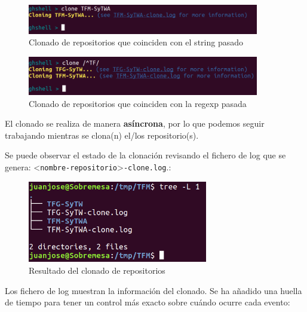 \begin{itemize}
		\begin{figure}[H]
		\begin{center}
		\includegraphics[width=0.9\textwidth]{images/clone1-1}
		\caption{Clonado de repositorios que coinciden con el string pasado}
		\label{fig:clone1-1}
		\end{center}
		\end{figure}
		
		\begin{figure}[H]
		\begin{center}
		\includegraphics[width=0.9\textwidth]{images/clone1-2}
		\caption{Clonado de repositorios que coinciden con la regexp pasada}
		\label{fig:clone1-2}
		\end{center}
		\end{figure}
		
		
		El clonado se realiza de manera {\bfseries asíncrona}, por lo que podemos seguir trabajando mientras se clona(n) el/los repositorio(s). 
\bigskip
		
		Se puede observar el estado de la clonación revisando el fichero de log que se genera: \textless \verb|nombre-repositorio|\textgreater \verb|-clone.log|.:
		
		\begin{figure}[H]
		\begin{center}
		\includegraphics[width=0.7\textwidth]{images/clone1-3}
		\caption{Resultado del clonado de repositorios}
		\label{fig:clone1-3}
		\end{center}
		\end{figure}
		
\newpage		
		Los fichero de log muestran la información del clonado. Se ha añadido una huella de tiempo para tener un control más exacto sobre cuándo ocurre cada evento:
		

\end{itemize}
